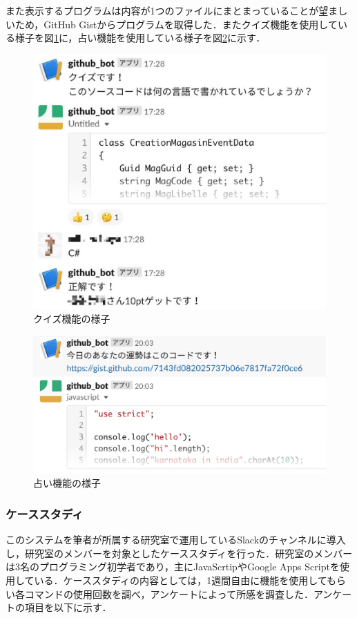   また表示するプログラムは内容が1つのファイルにまとまっていることが望ましいため，GitHub Gistからプログラムを取得した．またクイズ機能を使用している様子を図\ref{prototype_quiz}に，占い機能を使用している様子を図\ref{prototype_fortune}に示す．

\begin{figure}[!h]
  \begin{center}
    \includegraphics[width=0.4\linewidth]{image/prototype_quiz.eps}
  \end{center}
    \vspace{-8mm} 
  \caption{クイズ機能の様子}
  \label{prototype_quiz}
\end{figure}

\begin{figure}[!h]
  \begin{center}
    \includegraphics[width=0.6\linewidth]{image/prototype_fortune.eps}
  \end{center}
    \vspace{-8mm} 
  \caption{占い機能の様子}
  \label{prototype_fortune}
\end{figure}


\subsubsection{ケーススタディ}
このシステムを筆者が所属する研究室で運用しているSlackのチャンネルに導入し，研究室のメンバーを対象としたケーススタディを行った．研究室のメンバーは3名のプログラミング初学者であり，主にJavaScrtipやGoogle Apps Scriptを使用している．ケーススタディの内容としては，1週間自由に機能を使用してもらい各コマンドの使用回数を調べ，アンケートによって所感を調査した．アンケートの項目を以下に示す．

